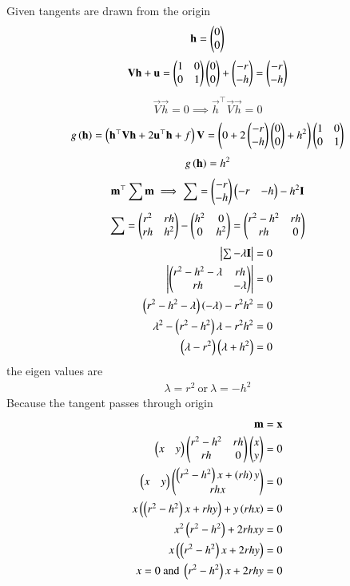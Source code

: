 \documentclass[journal]{IEEEtran}
\begin{document}
Given tangents are drawn from the origin
\begin{align}
    \mathbf{h}=\begin{pmatrix}0\\0\end{pmatrix}
\end{align}
\begin{align}
  \mathbf{V}\mathbf{h}+\mathbf{u}=\begin{pmatrix}1&0\\0&1\end{pmatrix}\begin{pmatrix}0\\0\end{pmatrix}+\begin{pmatrix}-r\\-h\end{pmatrix}=\begin{pmatrix}-r\\-h\end{pmatrix}
  \end{align}
  \begin{align}
   \vec{V}\vec{h}=0 \implies  \vec{h}^\top\vec{V}\vec{h}=0
   \end{align}
   \begin{align}
  g\left(\mathbf{h}\right)=\left(\mathbf{h}^{\top}\mathbf{V}\mathbf{h}+2\mathbf{u}^{\top}\mathbf{h} + f\right)\mathbf{V}=\left(0+2\begin{pmatrix}-r\\-h\end{pmatrix}\begin{pmatrix}0\\0\end{pmatrix}+h^2\right)\begin{pmatrix}1&0\\0&1\end{pmatrix}
\end{align}
\begin{align}
g\left(\mathbf{h}\right)=h^2
\end{align}
\begin{align}
\mathbf{m}^\top\sum\mathbf{m}\implies\sum=\begin{pmatrix}-r\\-h\end{pmatrix}\begin{pmatrix}-r&-h\end{pmatrix}-h^2\mathbf{I}
\end{align}
\begin{align}
\sum=\begin{pmatrix}r^2& rh \\rh &h^2\end{pmatrix}-\begin{pmatrix}h^2&0\\0&h^2\end{pmatrix}=\begin{pmatrix}r^2-h^2&rh\\rh&0\end{pmatrix}
\end{align}
\begin{align}
\begin{vmatrix}\sum-\lambda\mathbf{I}\end{vmatrix}=0\\
\begin{vmatrix}\begin{pmatrix}r^2-h^2-\lambda&rh\\rh&-\lambda\end{pmatrix}\end{vmatrix}=0\\
\left(r^2-h^2-\lambda\right)\left(-\lambda\right)-r^2h^2=0 \\
\lambda^2-\left(r^2-h^2\right)\lambda-r^2h^2=0\\
\left(\lambda-r^2\right)\left(\lambda+h^2\right)=0
\end{align}
the eigen values are
\begin{align}
    \lambda=r^2\ \text{or}\ \lambda=-h^2
\end{align}
 Because the tangent passes through  origin
 \begin{align}
     \mathbf{m}=\mathbf{x} \\
     \begin{pmatrix}x&y\end{pmatrix}\begin{pmatrix}r^2-h^2&rh\\rh&0\end{pmatrix}\begin{pmatrix}x\\y\end{pmatrix}=0 \\
     \begin{pmatrix}x&y\end{pmatrix}\begin{pmatrix}\left(r^2-h^2\right)x+\left(rh\right)y\\rhx\end{pmatrix}=0 \\
     x\begin{pmatrix}\left(r^2-h^2\right)x+rhy\end{pmatrix}+y\left(rhx\right)=0 \\
     x^2\left(r^2-h^2\right)+2rhxy=0 \\
     x\left(\left(r^2-h^2\right)x+2rhy\right)=0 \\
     x=0\ \text{and}\ \left(r^2-h^2\right)x+2rhy=0
 \end{align}
\end{document}
